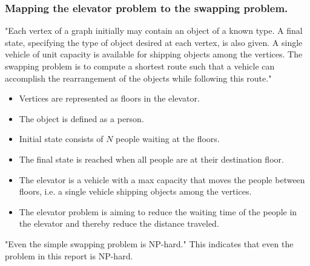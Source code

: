 
\subsubsection{Mapping the elevator problem to the swapping problem.}
"Each vertex of a graph initially may contain an object of a known type. A final state, specifying the type of object desired at each vertex, is also given. A single vehicle of unit capacity is available for shipping objects among the vertices. The swapping problem is to compute a shortest route such that a vehicle can accomplish the rearrangement of the objects while following this route."\cite{anily1992swapping}

\begin{itemize}
	\item Vertices are represented as floors in the elevator.
	\item The object is defined as a person.
	\item Initial state consists of $ N $ people waiting at the floors.
	\item The final state is reached when all people are at their destination floor.
	\item The elevator is a vehicle with a max capacity that moves the people between floors, i.e. a single vehicle shipping objects among the vertices.
	\item The elevator problem is aiming to reduce the waiting time of the people in the elevator and thereby reduce the distance traveled.
\end{itemize}

"Even the simple swapping problem is NP-hard."\cite{anily1992swapping} This indicates that even the problem in this report is NP-hard.
